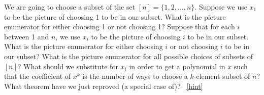 \documentclass{book}
\begin{document}
\setcounter{project}{244}
\addtocounter{project}{-1}
\begin{activity}[]\label{reprovingbinomialtheorem}
\hypertarget{p-1318}{}%
We are going to choose a subset of the set \([n]=\{1,2,\ldots, n\}\). Suppose we use \(x_1\) to be the picture of choosing 1 to be in our subset. What is the picture enumerator for either choosing 1 or not choosing 1? Suppose that for each \(i\) between 1 and \(n\), we use \(x_i\) to be the picture of choosing \(i\) to be in our subset. What is the picture enumerator for either choosing \(i\) or not choosing \(i\) to be in our subset? What is the picture enumerator for all possible choices of subsets of \([n]\)? What should we substitute for \(x_i\) in order to get a polynomial in \(x\) such that the coefficient of \(x^k\) is the number of ways to choose a \(k\)-element subset of \(n\)? What theorem have we just reproved (a special case of)?%
~\hfill{\tiny\hyperlink{a-244}{[hint]}\hypertarget{q-244}{}}\end{activity}
\end{document}
